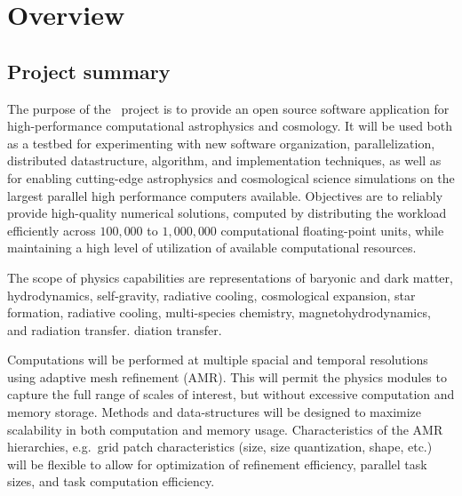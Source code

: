 \documentclass{article}[12pt]
\begin{document}

\tableofcontents

\section{Overview} \label{s:overview}

\subsection{Project summary}

The purpose of the \cello\ project is to provide an open source
software application for high-performance computational astrophysics
and cosmology.  It will be used both as a testbed for experimenting
with new software organization, parallelization, distributed
datastructure, algorithm, and implementation techniques, as well as
for enabling cutting-edge astrophysics and cosmological science
simulations on the largest parallel high performance computers
available.  Objectives are to reliably provide high-quality numerical
solutions, computed by distributing the workload efficiently across
$100,000$ to $1,000,000$ computational floating-point units, while
maintaining a high level of utilization of available computational
resources.

The scope of physics capabilities are representations of baryonic and
dark matter, hydrodynamics, self-gravity, radiative cooling,
cosmological expansion, star formation, radiative cooling,
multi-species chemistry, magnetohydrodynamics, and radiation transfer.
diation transfer.

  Computations will be performed at multiple spacial
   and temporal resolutions using adaptive mesh refinement (AMR).
   This will permit the physics modules to capture the full range of
   scales of interest, but without excessive computation and memory
   storage.  Methods and data-structures will be designed to maximize
   scalability in both computation and memory usage.  Characteristics
   of the AMR hierarchies, e.g.~grid patch characteristics (size, size
   quantization, shape, etc.) will be flexible to allow for
   optimization of refinement efficiency, parallel task sizes, and
   task computation efficiency.
\end{document}
